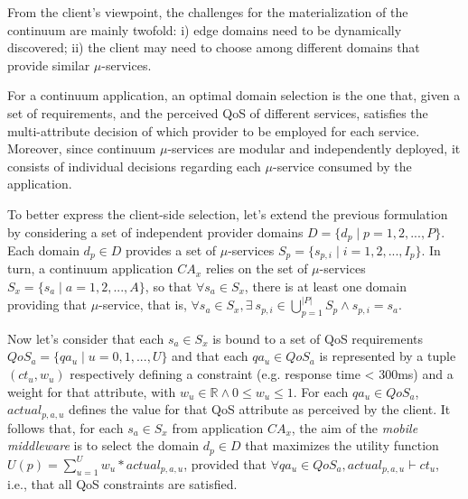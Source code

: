From the client's viewpoint, the challenges for the materialization of the continuum are mainly twofold: i) edge domains need to be dynamically discovered; ii) the client may need to choose among different domains that provide similar $\mu$-services.

For a continuum application, an optimal domain selection is the one that, given a set of requirements, and the perceived QoS of different services, satisfies the multi-attribute decision of which provider to be employed for each service. Moreover, since continuum $\mu$-services are modular and independently deployed, it consists of individual decisions regarding each $\mu$-service consumed by the application.

To better express the client-side selection, let's extend the previous formulation by considering a set of independent provider domains $D = \{d_p \mid p = 1,2,...,P\}$. Each domain $d_p \in D$ provides a set of $\mu$-services $S_{p} = \{s_{p,i} \mid i =  1,2,..., I_p\}$. In turn, a continuum application $CA_x$ relies on the set of $\mu$-services $S_x = \{s_a \mid a = 1,2,...,A\}$, so that $\forall s_a \in S_x$, there is at least one domain providing that $\mu$-service, that is, $\forall s_a \in S_x, \exists\ s_{p,i} \in \bigcup_{p=1}^{|P|} S_p \wedge s_{p,i} = s_a$. 

Now let's consider that each $s_a \in S_x$ is bound to a set of QoS requirements $QoS_a = \{qa_u \mid u = 0, 1, ..., U\}$ and that each $qa_u \in QoS_a$ is represented by a tuple $(ct_u, w_u)$ respectively defining a constraint (e.g. response time < 300ms) and a weight for that attribute, with $w_u \in \mathbb{R} \wedge 0 \le w_u \le 1$. For each $qa_u \in QoS_a$, $actual_{p,a,u}$ defines the value for that QoS attribute as perceived by the client. It follows that, for each $s_a \in S_x$ from application $CA_x$, the aim of the \textit{mobile middleware} is to select the domain $d_p \in D$ 
that maximizes the utility function $U(p) = \sum_{u=1}^{U} w_u * actual_{p,a,u}$, provided that $\forall qa_u \in QoS_a, actual_{p,a,u} \vdash ct_u$, i.e., that all QoS constraints are satisfied.



